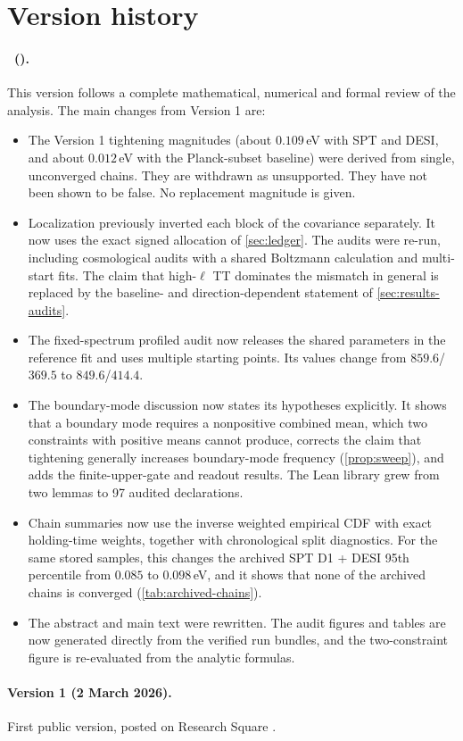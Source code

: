 \section{Version history}
\label{app:versions}

\paragraph{\manuscriptversion\ (\manuscriptdate).}
This version follows a complete mathematical, numerical and formal review of the analysis. The main changes from Version 1 are:
\begin{itemize}[leftmargin=*, itemsep=1pt]
  \item The Version 1 tightening magnitudes (about $0.109$\,eV with SPT and DESI, and about $0.012$\,eV with the Planck-subset baseline) were derived from single, unconverged chains. They are withdrawn as unsupported. They have not been shown to be false. No replacement magnitude is given.
  \item Localization previously inverted each block of the covariance separately. It now uses the exact signed allocation of \cref{sec:ledger}. The audits were re-run, including cosmological audits with a shared Boltzmann calculation and multi-start fits. The claim that high-$\ell$ TT dominates the mismatch in general is replaced by the baseline- and direction-dependent statement of \cref{sec:results-audits}.
  \item The fixed-spectrum profiled audit now releases the shared parameters in the reference fit and uses multiple starting points. Its values change from $859.6$/$369.5$ to $849.6$/$414.4$.
  \item The boundary-mode discussion now states its hypotheses explicitly. It shows that a boundary mode requires a nonpositive combined mean, which two constraints with positive means cannot produce, corrects the claim that tightening generally increases boundary-mode frequency (\cref{prop:sweep}), and adds the finite-upper-gate and readout results. The Lean library grew from two lemmas to 97 audited declarations.
  \item Chain summaries now use the inverse weighted empirical CDF with exact holding-time weights, together with chronological split diagnostics. For the same stored samples, this changes the archived SPT D1 + DESI 95th percentile from $0.085$ to $0.098$\,eV, and it shows that none of the archived chains is converged (\cref{tab:archived-chains}).
  \item The abstract and main text were rewritten. The audit figures and tables are now generated directly from the verified run bundles, and the two-constraint figure is re-evaluated from the analytic formulas.
\end{itemize}

\paragraph{Version 1 (2 March 2026).}
First public version, posted on Research Square \cite{tsiokos2026_neutrino_v1}.
